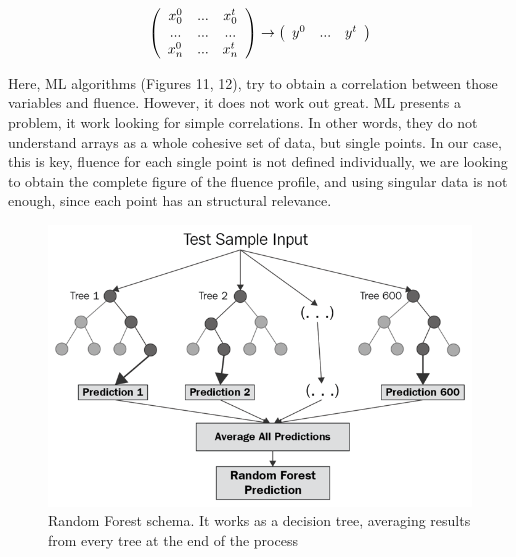 \documentclass[openany]{article}
\begin{document}
\begin{equation}

\centering
\left(
\begin{array}{ccc}
     x_0^0 & ... & x_0^t \\ 
     ... & ... & ... \\
     x_n^0 & ... & x_n^t 
\end{array}
\right) \rightarrow \left(\begin{array}{ccc}
    y^0 & ... & y^t \\
\end{array}\right)


\end{equation}




Here, ML algorithms (Figures 11, 12), try to obtain a correlation between those variables and fluence. However, it does not work out great. ML presents a problem, it work looking for simple correlations. In other words, they do not understand arrays as a whole cohesive set of data, but single points. In our case, this is key, fluence for each single point is not defined individually, we are looking to obtain the complete figure of the fluence profile, and using singular data is not enough, since each point has an structural relevance.

\newpage 

\begin{figure}[!h]
    \centering
    \includegraphics[width=\textwidth]{random-forest.png}
    \caption{Random Forest schema. It works as a decision tree, averaging results from every tree at the end of the process}
    \label{fig:my_label}
\end{figure}
\end{document}
